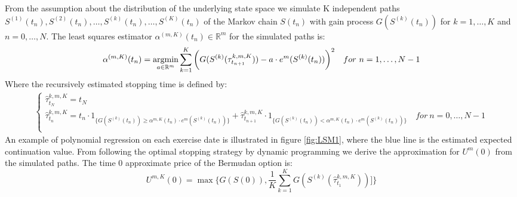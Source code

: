 From the assumption about the distribution of the underlying state space we simulate K independent paths $S^{(1)}(t_n), S^{(2)}(t_n), \ldots, S^{(k)}(t_n), \ldots, S^{(K)}(t_n)$ of the Markov chain $S(t_n)$ with gain process $G(S^{(k)}(t_n))$ for $k=1, \ldots, K$ and $n=0,\ldots,N$. The least squares estimator $\alpha^{(m,K)}(t_n)\in \mathbb{R}^m$ for the simulated paths is:
\begin{equation}\label{LSMestimator}
\alpha^{(m,K)}(t_n)= \operatorname*{argmin}_{a\in \mathbb{R}^m} \sum_{k=1}^{K} \bigg(G(S^{(k)}(\tau^{k,m,K}_{t_{n+1}}))  -a \cdot e^m(S^{(k)}(t_{n})) \bigg)^2 \quad for \ n=1, \ldots, N-1
\end{equation}
Where the recursively estimated stopping time is defined by:
\begin{equation*}\label{LSMDynamic3}
\begin{split}
\begin{cases}
          \hat{\tau}_{t_N}^{k,m,K} = t_N\\
          \hat{\tau}_{t_n}^{k,m,K} = t_n \cdot 1_{\{G(S^{(k)}(t_n)) \geq \alpha^{m,K}(t_{n}) \cdot e^m(S^{(k)}(t_{n})) \}} + \hat{\tau}_{t_{n+1}}^{k,m,K} \cdot 1_{\{G(S^{(k)}(t_n)) < \alpha^{m,K}(t_{n}) \cdot e^m(S^{(k)}(t_{n})) \}} \quad for \ n={0,\ldots,N-1} \\ 
\end{cases}
\end{split}
\end{equation*}
An example of polynomial regression on each exercise date is illustrated in figure \ref{fig:LSM1}, where the blue line is the estimated expected continuation value. From following the optimal stopping strategy by dynamic programming we derive the approximation for $U^{m}(0)$ from the simulated paths. The time 0 approximate price of the Bermudan option is:
\begin{equation*}
U^{m,K}(0) = \max \{ G(S(0)), \frac{1}{K} \sum_{k=1}^{K} G(S^{(k)}(\hat{\tau}^{k,m,K}_{t_1}))]\}
\end{equation*}

